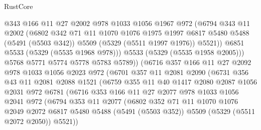 \begin{lexlean}{RustCore}
\begin{coremodule}
                  @343
                  @166
                  @11
                  @27
                  @2002
                  @978
                  @1033
                  @1056
                  @1967
                  @972
                  (@6794
                    @343
                    @11
                    @2002
                    (@6802
                      @342
                      @71
                      @11
                      @1070
                      @1076
                      @1975
                      @1997
                      @6817
                      @5480
                      @5488
                      (@5491 (@5503 @342))
                      @5509
                      (@5329 (@5511 @1997 @1976))
                      @5521))
                  @6851
                  @5533
                  (@5329 (@5535 @1968 @978)))
                @5533
                (@5329 (@5535 @1958 @2005)))
              @5768
              @5771
              @5774
              @5778
              @5783
              @5789))
          (@6716
            @357
            @166
            @11
            @27
            @2092
            @978
            @1033
            @1056
            @2023
            @972
            (@6701
              @357
              @11
              @2081
              @2090
              (@6731
                @356
                @43
                @11
                @2081
                @2088
                @1521
                (@6759
                  @355
                  @11
                  @40
                  @1417
                  @2080
                  @2087
                  @1056
                  @2031
                  @972
                  @6781
                  (@6716
                    @353
                    @166
                    @11
                    @27
                    @2077
                    @978
                    @1033
                    @1056
                    @2041
                    @972
                    (@6794
                      @353
                      @11
                      @2077
                      (@6802
                        @352
                        @71
                        @11
                        @1070
                        @1076
                        @2049
                        @2072
                        @6817
                        @5480
                        @5488
                        (@5491 (@5503 @352))
                        @5509
                        (@5329 (@5511 @2072 @2050))
                        @5521))

\end{coremodule}
\end{lexlean}
